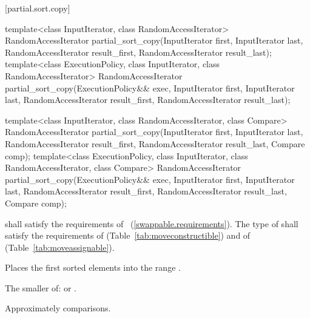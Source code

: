 [partial.sort.copy]{}

%
\begin{itemdecl}
template<class InputIterator, class RandomAccessIterator>
  RandomAccessIterator
    partial_sort_copy(InputIterator first, InputIterator last,
                      RandomAccessIterator result_first,
                      RandomAccessIterator result_last);
template<class ExecutionPolicy, class InputIterator, class RandomAccessIterator>
  RandomAccessIterator
    partial_sort_copy(ExecutionPolicy&& exec,
                      InputIterator first, InputIterator last,
                      RandomAccessIterator result_first,
                      RandomAccessIterator result_last);

template<class InputIterator, class RandomAccessIterator,
         class Compare>
  RandomAccessIterator
    partial_sort_copy(InputIterator first, InputIterator last,
                      RandomAccessIterator result_first,
                      RandomAccessIterator result_last,
                      Compare comp);
template<class ExecutionPolicy, class InputIterator, class RandomAccessIterator,
         class Compare>
  RandomAccessIterator
    partial_sort_copy(ExecutionPolicy&& exec,
                      InputIterator first, InputIterator last,
                      RandomAccessIterator result_first,
                      RandomAccessIterator result_last,
                      Compare comp);
\end{itemdecl}

\begin{itemdescr}
\pnum
\requires
{} shall satisfy the requirements of
~(\ref{swappable.requirements}). The type
of  shall satisfy the requirements of
 (Table~\ref{tab:moveconstructible}) and of
 (Table~\ref{tab:moveassignable}).

\pnum
\effects
Places the first
sorted elements into the range
.

\pnum
\returns
The smaller of:
 or
.

\pnum
\complexity
Approximately
comparisons.
\end{itemdescr}

